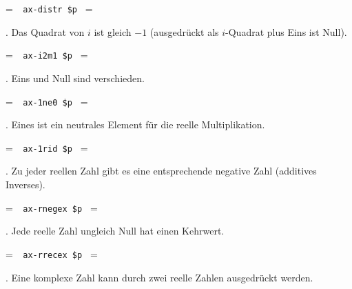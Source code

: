 \setbox\startprefix=\hbox{\tt \ \ ax-distr\ \$p\ }
\setbox\contprefix=\hbox{\tt \ \ \ \ \ \ \ \ \ \ \ \ \ }
\startm
\m{\vdash}\m{(}\m{(}\m{\in}\m{\wedge}\m{\in}%
\m{\wedge}\m{\in}\m{)}\m{\rightarrow}\m{(}\m{\cdot}\m{(}%
\m{+}\m{)}\m{)}\m{=}\m{(}\m{(}\m{\cdot}\m{)}\m{+}\m{(}%
\m{\cdot}\m{)}\m{)}\m{)}
\endm

. Das Quadrat von $i$ ist gleich $-1$ (ausgedrückt als $i$-Quadrat plus Eins ist Null).

\setbox\startprefix=\hbox{\tt \ \ ax-i2m1\ \$p\ }
\setbox\contprefix=\hbox{\tt \ \ \ \ \ \ \ \ \ \ \ \ }
\startm
\m{\vdash}\m{(}\m{(}\m{\cdot}\m{)}\m{+}\m{)}\m{=}
\endm

. Eins und Null sind verschieden.

\setbox\startprefix=\hbox{\tt \ \ ax-1ne0\ \$p\ }
\setbox\contprefix=\hbox{\tt \ \ \ \ \ \ \ \ \ \ \ \ }
\startm
\m{\vdash}\m{\ne}
\endm

. Eines ist ein neutrales Element für die reelle Multiplikation.

\setbox\startprefix=\hbox{\tt \ \ ax-1rid\ \$p\ }
\setbox\contprefix=\hbox{\tt \ \ \ \ \ \ \ \ \ \ \ }
\startm
\m{\vdash}\m{(}\m{\in}\m{\rightarrow}\m{(}\m{\cdot}%
\m{)}\m{=}\m{)}
\endm

. Zu jeder reellen Zahl gibt es eine entsprechende negative Zahl (additives Inverses).

\setbox\startprefix=\hbox{\tt \ \ ax-rnegex\ \$p\ }
\setbox\contprefix=\hbox{\tt \ \ \ \ \ \ \ \ \ \ \ \ \ \ }
\startm
\m{\vdash}\m{(}\m{\in}\m{\rightarrow}\m{\exists}\m{\in}%
\m{(}\m{+}\m{)}\m{=}\m{)}
\endm

. Jede reelle Zahl ungleich Null hat einen Kehrwert.

\setbox\startprefix=\hbox{\tt \ \ ax-rrecex\ \$p\ }
\setbox\contprefix=\hbox{\tt \ \ \ \ \ \ \ \ \ \ \ \ \ \ }
\startm
\m{\vdash}\m{(}\m{\in}\m{\rightarrow}\m{(}\m{\ne}%
\m{\rightarrow}\m{\exists}\m{\in}\m{(}\m{\cdot}%
\m{)}\m{=}\m{)}\m{)}
\endm

. Eine komplexe Zahl kann durch zwei reelle Zahlen ausgedrückt werden.

